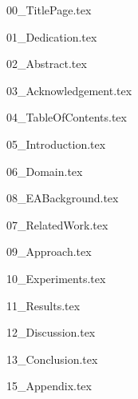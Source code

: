 \documentclass[version=last, pagesize=auto, paper=a4]{scrartcl}%
\begin{document}
{00_TitlePage.tex}

{01_Dedication.tex}

{02_Abstract.tex}

{03_Acknowledgement.tex}

{04_TableOfContents.tex}

{05_Introduction.tex}

{06_Domain.tex}

{08_EABackground.tex}

{07_RelatedWork.tex}


{09_Approach.tex}

{10_Experiments.tex}

{11_Results.tex}

{12_Discussion.tex}

{13_Conclusion.tex}


\clearpage



{15_Appendix.tex}

\end{document}
